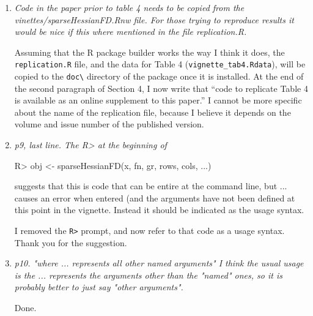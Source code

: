 \documentclass{article}
\newcommand{\filename}[1]{\texttt{#1}}
\newcommand{\code}[1]{\texttt{#1}}
\newcommand{\func}[1]{\code{#1}}
\newenvironment{revQuote}{\itshape}{\vspace{\baselineskip}}
\newenvironment{response}{\normalfont}{\vspace{\baselineskip}}
\begin{document}
\begin{enumerate}[align=left]
\begin{response}
\end{response}


\item \begin{revQuote}
Code in the paper prior to table 4 needs to be copied from the
vinettes/sparseHessianFD.Rnw file. For those trying to reproduce results it
would be nice if this where mentioned in the file replication.R.
  \end{revQuote}

  \begin{response}
Assuming that the R package builder works the way I think it does,
the \filename{replication.R} file, and the data for Table 4 (\filename{vignette\_tab4.Rdata}), will be
copied to the \filename{doc\textbackslash} directory of the package
once it is installed.  At the end of the second paragraph of Section
4, I now write that ``code to replicate Table 4 is available as an
online supplement to this paper.''  I cannot be more specific about
the name of the replication file, because I believe it depends on the
volume and issue number of the published version.
\end{response}


\item \begin{revQuote}
p9, last line. The R> at the beginning of
 
   R> obj <- sparseHessianFD(x, fn, gr, rows, cols, ...)

suggests that this is code that can be entire at the command line, but ...
causes an error when entered (and the arguments have not been defined at
this point in the vignette. Instead it should be indicated as the usage
syntax.
  \end{revQuote}

\begin{response}
  I removed the \func{R>} prompt, and now refer to that code as a usage
  syntax.  Thank you for the suggestion.
\end{response}


\item \begin{revQuote}
p10. "where ... represents all other named arguments"
   I think the usual usage is the ... represents the arguments other than
the "named" ones, so it is probably better to just say "other arguments".
\end{revQuote}

\begin{response}
  Done.
\end{response}



\end{enumerate}
\end{document}
